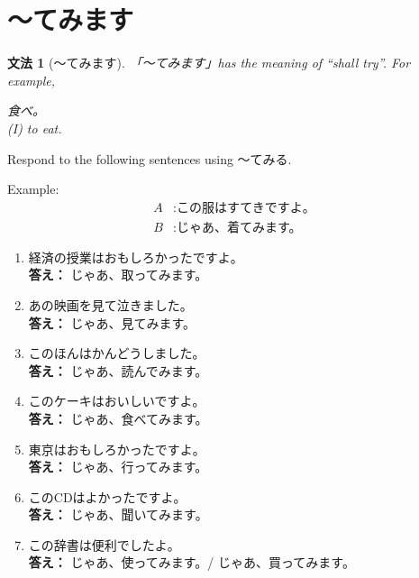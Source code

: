 \documentclass[notoc,notitlepage]{tufte-book}
\newtheorem{grammar}{文法}[section]
\begin{document}
\section{〜てみます}%
\label{sec:_temimasu}

\begin{grammar}[〜てみます]
\label{grammar:_temimasu}
  「〜てみます」has the meaning of ``shall try''. For example,
  \begin{center}
    食べ。\\
    (I)  to eat.
  \end{center}
\end{grammar}

\begin{ex}
  Respond to the following sentences using 〜てみる.

  Example:
  \begin{align*}
    A &: \text{この服はすてきですよ。} \\
    B &: \text{じゃあ、着てみます。}
  \end{align*}

  \begin{enumerate}
    \item 経済の授業はおもしろかったですよ。 \\
      \textbf{答え：} じゃあ、取ってみます。
    \item あの映画を見て泣きました。 \\
      \textbf{答え：} じゃあ、見てみます。
    \item このほんはかんどうしました。 \\
      \textbf{答え：} じゃあ、読んでみます。
    \item このケーキはおいしいですよ。 \\
      \textbf{答え：} じゃあ、食べてみます。
    \item 東京はおもしろかったですよ。 \\
      \textbf{答え：} じゃあ、行ってみます。
    \item このCDはよかったですよ。 \\
      \textbf{答え：} じゃあ、聞いてみます。
    \item この辞書は便利でしたよ。 \\
      \textbf{答え：} じゃあ、使ってみます。/ じゃあ、買ってみます。
  \end{enumerate}
\end{ex}
\end{document}

